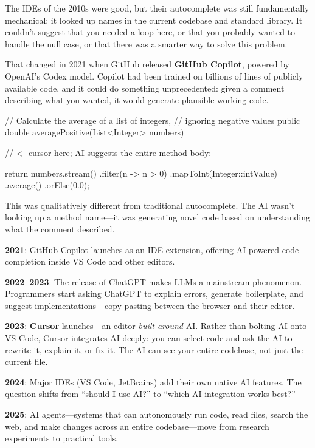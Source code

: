 \documentclass[11pt,letterpaper]{article}
\newcommand{\keyterm}[1]{\textbf{\textcolor{cssecondary}{#1}}}
\begin{document}
The IDEs of the 2010s were good, but their autocomplete was still fundamentally mechanical: it looked up names in the current codebase and standard library. It couldn't suggest that you needed a loop here, or that you probably wanted to handle the null case, or that there was a smarter way to solve this problem.

That changed in 2021 when GitHub released \keyterm{GitHub Copilot}, powered by OpenAI's Codex model. Copilot had been trained on billions of lines of publicly available code, and it could do something unprecedented: given a comment describing what you wanted, it would generate plausible working code.

\begin{javacode}
// Calculate the average of a list of integers,
// ignoring negative values
public double averagePositive(List<Integer> numbers) {
    // <- cursor here; AI suggests the entire method body:

    return numbers.stream()
        .filter(n -> n > 0)
        .mapToInt(Integer::intValue)
        .average()
        .orElse(0.0);
}
\end{javacode}

This was qualitatively different from traditional autocomplete. The AI wasn't looking up a method name---it was generating novel code based on understanding what the comment described.

\begin{historybox}
\textbf{2021}: GitHub Copilot launches as an IDE extension, offering AI-powered code completion inside VS Code and other editors.

\textbf{2022--2023}: The release of ChatGPT makes LLMs a mainstream phenomenon. Programmers start asking ChatGPT to explain errors, generate boilerplate, and suggest implementations---copy-pasting between the browser and their editor.

\textbf{2023}: \textbf{Cursor} launches---an editor \textit{built around} AI. Rather than bolting AI onto VS Code, Cursor integrates AI deeply: you can select code and ask the AI to rewrite it, explain it, or fix it. The AI can see your entire codebase, not just the current file.

\textbf{2024}: Major IDEs (VS Code, JetBrains) add their own native AI features. The question shifts from ``should I use AI?'' to ``which AI integration works best?''

\textbf{2025}: AI agents---systems that can autonomously run code, read files, search the web, and make changes across an entire codebase---move from research experiments to practical tools.
\end{historybox}
\end{document}
